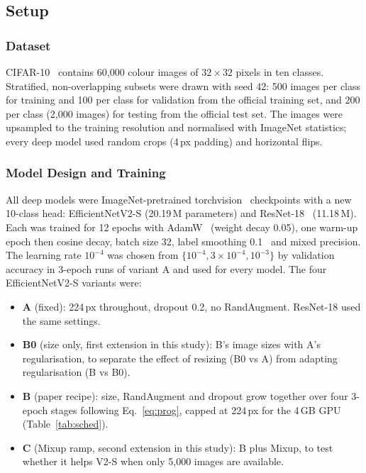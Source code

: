 \documentclass{COMPXXXX}
\begin{document}
\subsection{Setup}
\subsubsection{Dataset}
CIFAR-10~\cite{krizhevsky2009learning} contains 60{,}000 colour images of $32{\times}32$ pixels in ten
classes. Stratified, non-overlapping subsets were drawn with seed 42: 500 images per class for training
and 100 per class for validation from the official training set, and 200 per class (2{,}000 images)
for testing from the official test set. The images were upsampled to the training resolution and
normalised with ImageNet statistics; every deep model used random crops (4\,px padding) and horizontal
flips.

\subsubsection{Model Design and Training}
All deep models were ImageNet-pretrained torchvision~\cite{torchvision2016} checkpoints with a new
10-class head: EfficientNetV2-S (20.19\,M parameters) and ResNet-18~\cite{he2016deep} (11.18\,M). Each
was trained for 12 epochs with AdamW~\cite{loshchilov2019decoupled} (weight decay 0.05), one warm-up
epoch then cosine decay, batch size 32, label smoothing 0.1~\cite{szegedy2016rethinking} and mixed
precision. The learning rate $10^{-4}$ was chosen from $\{10^{-4}, 3{\times}10^{-4}, 10^{-3}\}$ by
validation accuracy in 3-epoch runs of variant A and used for every model. The four EfficientNetV2-S
variants were:
\begin{itemize}
\item \textbf{A} (fixed): 224\,px throughout, dropout 0.2, no RandAugment. ResNet-18 used the same settings.
\item \textbf{B0} (size only, first extension in this study): B's image sizes with A's regularisation, to separate
the effect of resizing (B0 vs A) from adapting regularisation (B vs B0).
\item \textbf{B} (paper recipe): size, RandAugment and dropout grow together over four 3-epoch stages
following Eq.~\eqref{eq:prog}, capped at 224\,px for the 4\,GB GPU (Table~\ref{tab:sched}).
\item \textbf{C} (Mixup ramp, second extension in this study): B plus Mixup, to test whether it helps V2-S when
only 5{,}000 images are available.
\end{itemize}
\end{document}
